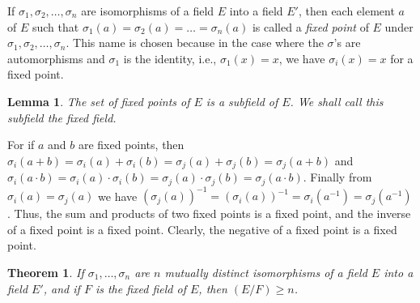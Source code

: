 \documentclass[10pt,leqno]{article}
\newtheorem{theo}{Theorem}
\newtheorem*{lemm*}{Lemma}
\theoremstyle{definition}
\begin{document}
If $\sigma_1, \sigma_2, \ldots, \sigma_n$ are isomorphisms of a field $E$ into a field $E'$, then each element $a$ of $E$ such that $\sigma_1(a) = \sigma_2(a) = \ldots = \sigma_n(a)$ is called a \emph{fixed point} of $E$ under $\sigma_1, \sigma_2, \ldots, \sigma_n$.
This name is chosen because in the case where the $\sigma$'s are automorphisms and $\sigma_1$ is the identity, i.e., $\sigma_1(x) = x$, we have $\sigma_i(x) = x$ for a fixed point.


\begin{lemm*}
The set of fixed points of $E$ is a subfield of $E$.
We shall call this subfield the fixed field.
\end{lemm*}

For if $a$ and $b$ are fixed points, then $\sigma_i(a + b) = \sigma_i(a) + \sigma_i(b) = \sigma_j(a) + \sigma_j(b) = \sigma_j(a + b)$ and $\sigma_i(a \cdot b) = \sigma_i(a) \cdot \sigma_i(b) = \sigma_j(a) \cdot \sigma_j(b) = \sigma_j(a \cdot b)$.
Finally from $\sigma_i(a) = \sigma_j(a)$ we have $(\sigma_j(a))^{-1} = (\sigma_i(a))^{-1} = \sigma_i(a^{-1}) = \sigma_j(a^{-1})$.
Thus, the sum and products of two fixed points is a fixed point, and the inverse of a fixed point is a fixed point.
Clearly, the negative of a fixed point is a fixed point.


\begin{theo}
\label{theo:onth}
If $\sigma_1, \ldots, \sigma_n$ are $n$ mutually distinct isomorphisms of a field $E$ into a field $E'$, and if $F$ is the fixed field of $E$, then $(E/F) \geq n$.
\end{theo}
\end{document}
